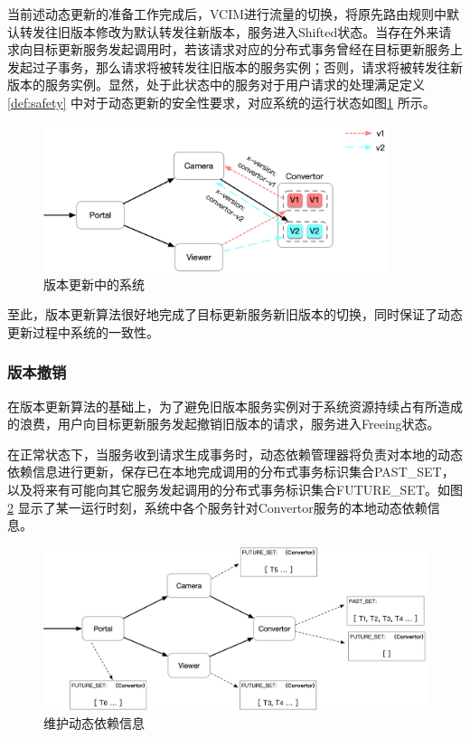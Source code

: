 \documentclass[macfonts,master]{njuthesis}
\begin{document}
当前述动态更新的准备工作完成后，VCIM进行流量的切换，将原先路由规则中默认转发往旧版本修改为默认转发往新版本，服务进入Shifted状态。当存在外来请求向目标更新服务发起调用时，若该请求对应的分布式事务曾经在目标更新服务上发起过子事务，那么请求将被转发往旧版本的服务实例；否则，请求将被转发往新版本的服务实例。显然，处于此状态中的服务对于用户请求的处理满足定义\ref{def:safety} 中对于动态更新的安全性要求，对应系统的运行状态如图\ref{fig:convertor_shift_v1v2} 所示。

\begin{figure}[!htbp]
  \centering
  \includegraphics[width= 0.9\textwidth]{image/convertor_shift_v1v2.png}
  \caption{版本更新中的系统}
  \label{fig:convertor_shift_v1v2}
\end{figure}

至此，版本更新算法很好地完成了目标更新服务新旧版本的切换，同时保证了动态更新过程中系统的一致性。

\subsubsection{版本撤销}
在版本更新算法的基础上，为了避免旧版本服务实例对于系统资源持续占有所造成的浪费，用户向目标更新服务发起撤销旧版本的请求，服务进入Freeing状态。


在正常状态下，当服务收到请求生成事务时，动态依赖管理器将负责对本地的动态依赖信息进行更新，保存已在本地完成调用的分布式事务标识集合PAST\_SET，以及将来有可能向其它服务发起调用的分布式事务标识集合FUTURE\_SET。如图\ref{fig:normal_past_set} 显示了某一运行时刻，系统中各个服务针对Convertor服务的本地动态依赖信息。

\begin{figure}[!htbp]
  \centering
  \includegraphics[width= 1.0\textwidth]{image/normal_past_set_2.png}
  \caption{维护动态依赖信息}
  \label{fig:normal_past_set}
\end{figure}
\end{document}
